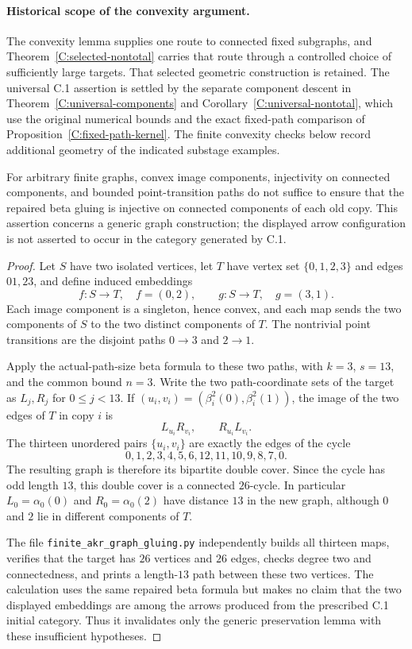\paragraph{Historical scope of the convexity argument.}
The convexity lemma supplies one route to connected fixed
subgraphs, and Theorem~\ref{C:selected-nontotal} carries that
route through a controlled choice of sufficiently large targets.
That selected geometric construction is retained. The universal
C.1 assertion is settled by the separate component descent in
Theorem~\ref{C:universal-components} and
Corollary~\ref{C:universal-nontotal}, which use the original
numerical bounds and the exact fixed-path comparison of
Proposition~\ref{C:fixed-path-kernel}. The finite convexity
checks below record additional geometry of the indicated
substage examples.

\begin{proposition}
\label{C:generic-component-warning}
For arbitrary finite graphs, convex image components, injectivity on
connected components, and bounded point-transition paths do not suffice
to ensure that the repaired beta gluing is injective on connected
components of each old copy. This assertion concerns a generic graph
construction; the displayed arrow configuration is not asserted to
occur in the category generated by C.1.
\end{proposition}
\begin{proof}
Let $S$ have two isolated vertices, let $T$ have vertex set
$\{0,1,2,3\}$ and edges $01,23$, and define induced embeddings
\[
 f:S\to T,\quad f=(0,2),\qquad
 g:S\to T,\quad g=(3,1).
\]
Each image component is a singleton, hence convex, and each map
sends the two components of $S$ to the two distinct components of
$T$. The nontrivial point transitions are the disjoint paths
$0\to3$ and $2\to1$.

Apply the actual-path-size beta formula to these two paths, with
$k=3$, $s=13$, and the common bound $n=3$. Write the two path-coordinate
sets of the target as $L_j,R_j$ for $0\leq j<13$. If
$(u_i,v_i)=(\beta_i^2(0),\beta_i^2(1))$, the image of the two
edges of $T$ in copy $i$ is
\[
 L_{u_i}R_{v_i},\qquad R_{u_i}L_{v_i}.
\]
The thirteen unordered pairs $\{u_i,v_i\}$ are exactly the edges
of the cycle
\[
 0,1,2,3,4,5,6,12,11,10,9,8,7,0.
\]
The resulting graph is therefore its bipartite double cover. Since
the cycle has odd length $13$, this double cover is a connected
$26$-cycle. In particular $L_0=\alpha_0(0)$ and
$R_0=\alpha_0(2)$ have distance $13$ in the new graph, although
$0$ and $2$ lie in different components of $T$.

The file \texttt{finite\_akr\_graph\_gluing.py} independently builds
all thirteen maps, verifies that the target has $26$ vertices and
$26$ edges, checks degree two and connectedness, and prints a
length-$13$ path between these two vertices. The calculation uses
the same repaired beta formula but makes no claim that the two
displayed embeddings are among the arrows produced from the
prescribed C.1 initial category. Thus it invalidates only the generic
preservation lemma with these insufficient hypotheses.
\end{proof}

